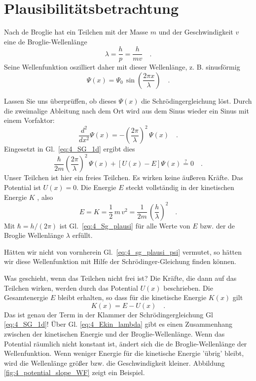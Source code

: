 \section{Plausibilitätsbetrachtung}

Nach de Broglie hat ein Teilchen mit der Masse $m$ und der Geschwindigkeit $v$ eine de Broglie-Wellenlänge 
\begin{equation}
    \lambda = \frac{h}{p} = \frac{h}{ m v} \quad .
\end{equation}
Seine Wellenfunktion oszilliert daher mit dieser Wellenlänge, z. B. sinusförmig
\begin{equation}
    \Psi(x) = \Psi_0 \, \sin\left( \frac{2 \pi x}{\lambda} \right) \quad .
    \label{eq:4_sg_plausi_psi}
\end{equation}

Lassen Sie uns überprüffen, ob dieses $\Psi(x)$ die Schrödingergleichung löst.
Durch die zweimalige Ableitung nach dem Ort wird aus dem Sinus wieder ein Sinus mit einem Vorfaktor:
\begin{equation}
    \frac{d^2}{dx^2} \Psi(x)  = - \left(\frac{2 \pi}{\lambda} \right)^2 \, \Psi(x) \quad .
\end{equation}
Eingesetzt in Gl.~\ref{eq:4_SG_1d} ergibt dies
\begin{equation}
     \frac{\hbar}{2m}  \left(\frac{2 \pi}{\lambda} \right)^2 \,  \Psi(x) + \left[ U(x) - E \right] \Psi(x) \overset{?}{=} 0 \quad .
     \label{eq:4_Sg_plausi}
\end{equation}
Unser Teilchen ist hier ein freies Teilchen. Es wirken keine äußeren Kräfte. Das Potential ist $U(x) = 0$. Die Energie $E$ steckt vollständig in der kinetischen Energie $K$ , also 
\begin{equation}
    E =  K = \frac{1}{2} \, m \,  v^2 =  \frac{1}{2m} \, \left( \frac{h}{\lambda} \right)^2 \quad .
    \label{eq:4_Ekin_lambda}
\end{equation}
Mit $\hbar = h / (2 \pi)$ ist Gl.~\ref{eq:4_Sg_plausi} für alle Werte von $E$ bzw. der de Broglie Wellenlänge $\lambda$ erfüllt.

Hätten wir nicht von vornherein  Gl.~\ref{eq:4_sg_plausi_psi} vermutet, so hätten wir diese Wellenfunktion mit Hilfe der Schrödinger-Gleichung finden können.

Was geschieht, wenn das Teilchen nicht frei ist? Die Kräfte, die dann auf das Teilchen wirken, werden durch das Potential $U(x)$ beschrieben. Die Gesamtenergie $E$ bleibt erhalten, so dass für die kinetische Energie $K(x)$ gilt
\begin{equation}
    K(x) = E - U(x) \quad .
\end{equation}
Das ist genau der Term in der Klammer der Schrödingergleichung Gl \ref{eq:4_SG_1d}! Über Gl. \ref{eq:4_Ekin_lambda} gibt es einen Zusammenhang zwischen der kinetischen Energie und der Broglie-Wellenlänge. Wenn das Potential räumlich nicht konstant ist, ändert sich die de Broglie-Wellenlänge der Wellenfunktion. Wenn weniger Energie für die kinetische Energie 'übrig' bleibt, wird die Wellenlänge größer bzw. die Geschwindigkeit kleiner. Abbildung  \ref{fig:4_potential_slope_WF} zeigt ein Beispiel.

